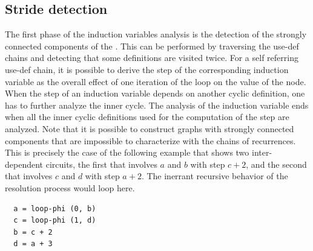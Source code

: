\subsection{Stride detection}

The first phase of the induction variables analysis is the detection of
the strongly connected components of the \SSA{}.  This can be
performed by traversing the use-def \SSA{} chains and detecting that some definitions are visited twice.
For a self referring use-def chain, it is possible to derive the step of the corresponding induction variable as the  
overall effect of one iteration of the loop on the value of the \loopphi{} node.  When the step of an
induction variable depends on another cyclic definition, one has to
further analyze the inner cycle.  The analysis of the induction
variable ends when all the inner cyclic definitions used for the
computation of the step are analyzed. Note that it is possible to
construct \SSA{} graphs with strongly connected components that are
impossible to characterize with the chains of recurrences. This is precisely the case of the following example that shows two inter-dependent circuits, the first that involves $a$ and $b$ with step $c+2$, and the second that involves $c$ and $d$ with step $a+2$. The inerrant recursive behavior of the resolution process would loop here.
\begin{verbatim}
  a = loop-phi (0, b)
  c = loop-phi (1, d)
  b = c + 2
  d = a + 3
\end{verbatim}

